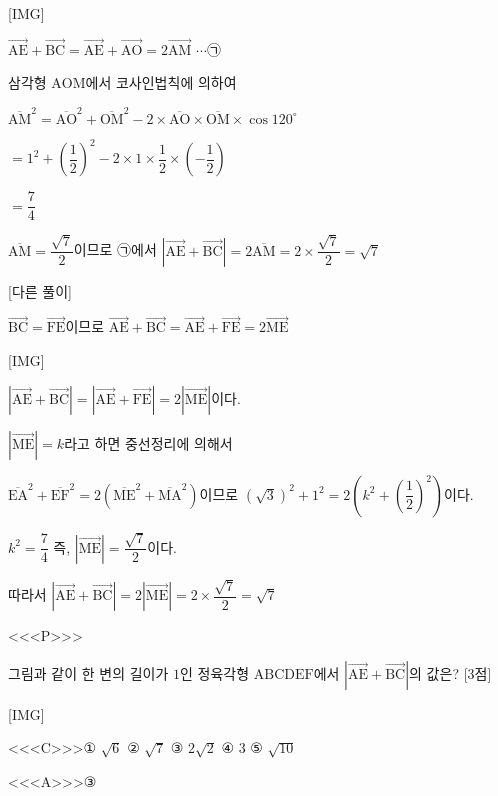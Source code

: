 \documentclass{oblivoir}
\begin{document}
[IMG]

$\overrightarrow{\mathrm{AE}}+\overrightarrow{\mathrm{BC}}=\overrightarrow{\mathrm{AE}}+\overrightarrow{\mathrm{AO}}=2\overrightarrow{\mathrm{AM}}$ $\cdots$㉠

삼각형 $\mathrm{AOM}$에서 코사인법칙에 의하여 

$\overline{\mathrm{AM}}^{2}$$=\overline{\mathrm{AO}}^{2}+\overline{\mathrm{OM}}^{2}-2\times\overline{\mathrm{AO}}\times\overline{\mathrm{OM}}\times\cos 120^{\circ}$

$=1^{2}+\left(\dfrac{1}{2}\right)^{2}-2\times 1\times\dfrac{1}{2}\times\left(-\dfrac{1}{2}\right)$

$=\dfrac{7}{4}$

$\overline{\mathrm{AM}}=\dfrac{\sqrt{7}}{2}$이므로 ㉠에서 $|\overrightarrow{\mathrm{AE}}+\overrightarrow{\mathrm{BC}}| =2\overline{\mathrm{AM}}=2\times\dfrac{\sqrt{7}}{2}=\sqrt{7}$

[다른 풀이]

$\overrightarrow{\mathrm{BC}}=\overrightarrow{\mathrm{FE}}$이므로 $\overrightarrow{\mathrm{AE}}+\overrightarrow{\mathrm{BC}}=\overrightarrow{\mathrm{AE}}+\overrightarrow{\mathrm{FE}}= 2\overrightarrow{\mathrm{ME}}$

[IMG]

$|\overrightarrow{\mathrm{AE}}+\overrightarrow{\mathrm{BC}}| = |\overrightarrow{\mathrm{AE}}+\overrightarrow{\mathrm{FE}}| = 2 |\overrightarrow{\mathrm{ME}}|$이다. 

$|\overrightarrow{\mathrm{ME}}| = k$라고 하면 중선정리에 의해서 

$\overline{\mathrm{EA}}^{2}+\overline{\mathrm{EF}}^{2}=2\left(\overline{\mathrm{ME}}^{2}+\overline{\mathrm{MA}}^{2}\right)$이므로 $(\sqrt{3})^{2}+1^{2}=2\left(k^{2}+\left(\dfrac{1}{2}\right)^{2}\right)$이다.

$k^{2}=\dfrac{7}{4}$ 즉, $|\overrightarrow{\mathrm{ME}}| =\dfrac{\sqrt{7}}{2}$이다.

따라서 $|\overrightarrow{\mathrm{AE}}+\overrightarrow{\mathrm{BC}}| = 2 |\overrightarrow{\mathrm{ME}}| =2\times\dfrac{\sqrt{7}}{2}=\sqrt{7}$

<<<P>>>

그림과 같이 한 변의 길이가 $1$인 정육각형 $\mathrm{ABCDEF}$에서 $|\overrightarrow{\mathrm{AE}}+\overrightarrow{\mathrm{BC}}|$의 값은? [3점]

[IMG]

<<<C>>>① $\sqrt{6}$ ② $\sqrt{7}$ ③ $2\sqrt{2}$ ④ $3$ ⑤ $\sqrt{10}$

<<<A>>>③
\end{document}
